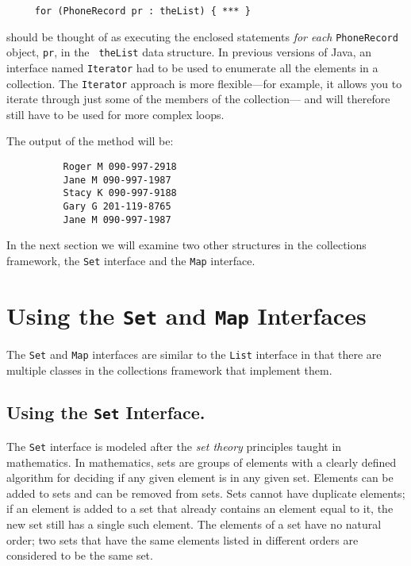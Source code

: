 \begin{jjjlisting}
\begin{lstlisting}
     for (PhoneRecord pr : theList) { *** }
\end{lstlisting}
\end{jjjlisting}

\noindent should be thought of as executing the enclosed statements
{\em for each} {\tt PhoneRecord} object, {\tt pr}, in the {\tt
theList} data structure.  In previous versions of Java, an interface
named {\tt Iterator} had to be used to enumerate all the elements in a
collection.  The {\tt Iterator} approach is more flexible---for
example, it allows you to iterate through just some of the members of
the collection--- and will therefore still have to be used for more
complex loops.

The output of the method will be:
\begin{jjjlisting}
\begin{lstlisting}
          Roger M 090-997-2918
          Jane M 090-997-1987
          Stacy K 090-997-9188
          Gary G 201-119-8765
          Jane M 090-997-1987
\end{lstlisting}
\end{jjjlisting}

In the next section we will examine two other structures in the collections
framework, the {\tt Set} interface and the {\tt Map} interface.


\section{ Using the {\tt Set} and {\tt Map} Interfaces}
\label{usingthe-interfaces}

The {\tt Set} and {\tt Map} interfaces are similar to the {\tt List}
interface in that there are multiple classes in the collections framework
that implement them.

\subsection{Using the {\tt Set} Interface.}

The {\tt Set} interface is modeled after the {\em set theory}
principles taught in mathematics.  In mathematics, sets are groups of
elements with a clearly defined algorithm for deciding if any given
element is in any given set.  Elements can be added to sets and can be
removed from sets. Sets cannot have duplicate elements; if an element
is added to a set that already contains an element equal to it, the
new set still has a single such element.  The elements of a set have
no natural order; two sets that have the same elements listed in
different orders are considered to be the same set.

